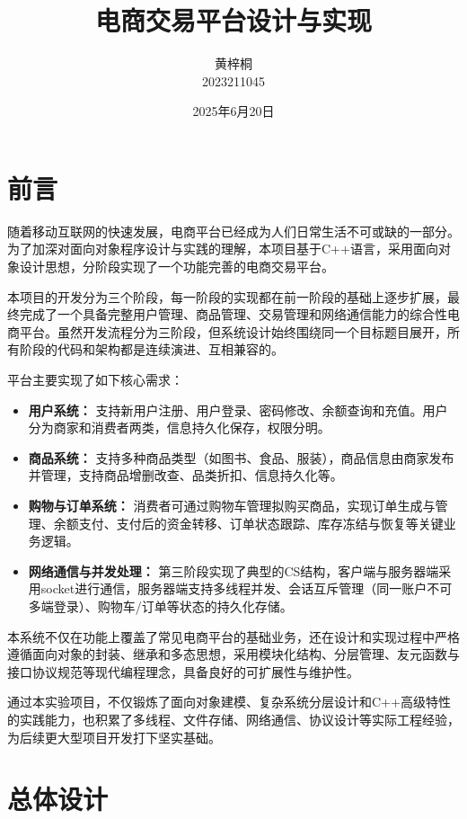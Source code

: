 \documentclass[11pt]{article}
\title{电商交易平台设计与实现}
\author{黄梓桐\\2023211045}
\date{2025年6月20日}
\begin{document}
\maketitle
\tableofcontents
\newpage

\section{前言}

随着移动互联网的快速发展，电商平台已经成为人们日常生活不可或缺的一部分。为了加深对面向对象程序设计与实践的理解，本项目基于C++语言，采用面向对象设计思想，分阶段实现了一个功能完善的电商交易平台。

本项目的开发分为三个阶段，每一阶段的实现都在前一阶段的基础上逐步扩展，最终完成了一个具备完整用户管理、商品管理、交易管理和网络通信能力的综合性电商平台。虽然开发流程分为三阶段，但系统设计始终围绕同一个目标题目展开，所有阶段的代码和架构都是连续演进、互相兼容的。

平台主要实现了如下核心需求：

\begin{itemize}
    \item \textbf{用户系统：} 支持新用户注册、用户登录、密码修改、余额查询和充值。用户分为商家和消费者两类，信息持久化保存，权限分明。
    \item \textbf{商品系统：} 支持多种商品类型（如图书、食品、服装），商品信息由商家发布并管理，支持商品增删改查、品类折扣、信息持久化等。
    \item \textbf{购物与订单系统：} 消费者可通过购物车管理拟购买商品，实现订单生成与管理、余额支付、支付后的资金转移、订单状态跟踪、库存冻结与恢复等关键业务逻辑。
    \item \textbf{网络通信与并发处理：} 第三阶段实现了典型的CS结构，客户端与服务器端采用socket进行通信，服务器端支持多线程并发、会话互斥管理（同一账户不可多端登录）、购物车/订单等状态的持久化存储。
\end{itemize}

本系统不仅在功能上覆盖了常见电商平台的基础业务，还在设计和实现过程中严格遵循面向对象的封装、继承和多态思想，采用模块化结构、分层管理、友元函数与接口协议规范等现代编程理念，具备良好的可扩展性与维护性。

通过本实验项目，不仅锻炼了面向对象建模、复杂系统分层设计和C++高级特性的实践能力，也积累了多线程、文件存储、网络通信、协议设计等实际工程经验，为后续更大型项目开发打下坚实基础。

\newpage
\section{总体设计}
\end{document}

